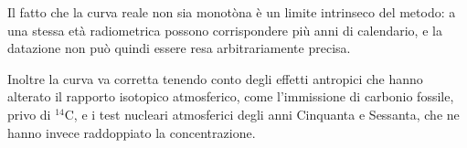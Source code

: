 
Il fatto che la curva reale non sia monotòna è un limite intrinseco del metodo: a una stessa età radiometrica possono corrispondere più anni di calendario, e la datazione non può quindi essere resa arbitrariamente precisa. 

Inoltre la curva va corretta tenendo conto degli effetti antropici che hanno alterato il rapporto isotopico atmosferico, come l'immissione di carbonio fossile, privo di $^{14}\mathrm{C}$, e i test nucleari atmosferici degli anni Cinquanta e Sessanta, che ne hanno invece raddoppiato la concentrazione.